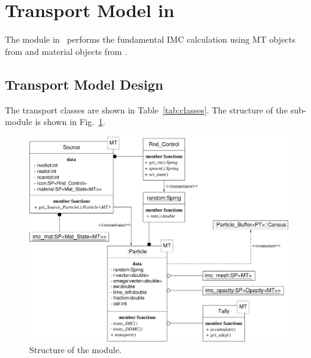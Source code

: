 
\section{Transport Model in }

The  module in \imctest\ performs the fundamental IMC 
calculation using MT objects from  and material
objects from .  

\subsection{Transport Model Design}

The transport classes are shown in Table~\ref{tab:classes}.  The
structure of the  sub-module is shown in
Fig.~\ref{fig:trans}.
\begin{figure}
  \centerline{
    \includegraphics[width=6in]{trans.eps}}
  \caption{Structure of the  module.}
  \label{fig:trans}
\end{figure}

